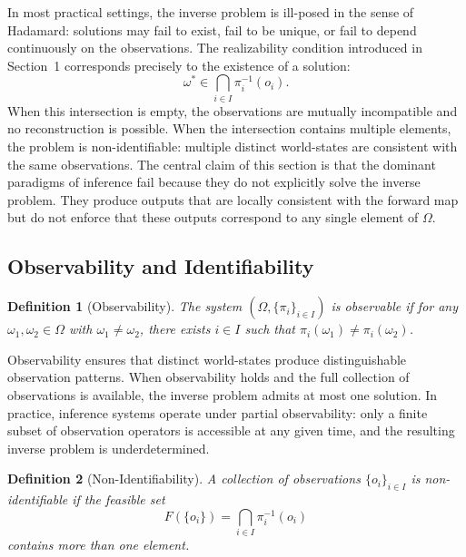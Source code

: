 \documentclass[12pt, oneside]{article}
\newtheorem{definition}{Definition}
\begin{document}
In most practical settings, the inverse problem is ill-posed in the sense of Hadamard: solutions may fail to exist, fail to be unique, or fail to depend continuously on the observations. The realizability condition introduced in Section~1 corresponds precisely to the existence of a solution:
\begin{equation}
  \omega^* \in \bigcap_{i \in I} \pi_i^{-1}(o_i).
\end{equation}
When this intersection is empty, the observations are mutually incompatible and no reconstruction is possible. When the intersection contains multiple elements, the problem is non-identifiable: multiple distinct world-states are consistent with the same observations. The central claim of this section is that the dominant paradigms of inference fail because they do not explicitly solve the inverse problem. They produce outputs that are locally consistent with the forward map but do not enforce that these outputs correspond to any single element of $\Omega$.

\subsection{Observability and Identifiability}

\begin{definition}[Observability]
The system $(\Omega, \{\pi_i\}_{i \in I})$ is observable if for any $\omega_1, \omega_2 \in \Omega$ with $\omega_1 \neq \omega_2$, there exists $i \in I$ such that $\pi_i(\omega_1) \neq \pi_i(\omega_2)$.
\end{definition}

Observability ensures that distinct world-states produce distinguishable observation patterns. When observability holds and the full collection of observations is available, the inverse problem admits at most one solution. In practice, inference systems operate under partial observability: only a finite subset of observation operators is accessible at any given time, and the resulting inverse problem is underdetermined.

\begin{definition}[Non-Identifiability]
A collection of observations $\{o_i\}_{i \in I}$ is non-identifiable if the feasible set
\begin{equation}
  F(\{o_i\}) = \bigcap_{i \in I} \pi_i^{-1}(o_i)
\end{equation}
contains more than one element.
\end{definition}
\end{document}
